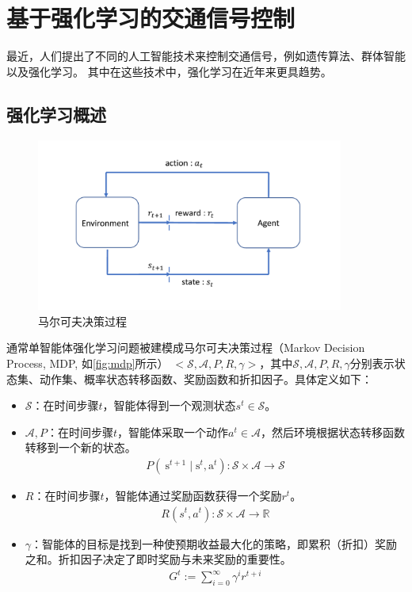 \section{基于强化学习的交通信号控制}
最近，人们提出了不同的人工智能技术来控制交通信号，例如遗传算法、群体智能以及强化学习。 其中在这些技术中，强化学习在近年来更具趋势。
\subsection{强化学习概述}
\begin{figure}[htb]
    \includegraphics[width=0.9\textwidth]{fig/rl.pdf}
    \caption{马尔可夫决策过程}
    \label{fig:mdp}
\end{figure}
通常单智能体强化学习问题被建模成马尔可夫决策过程（Markov Decision Process, MDP, 如\autoref{fig:mdp}所示） $<\mathcal{S}, \mathcal{A}, P, R, \gamma>$，其中$\mathcal{S}, \mathcal{A}, P, R, \gamma$分别表示状态集、动作集、概率状态转移函数、奖励函数和折扣因子。具体定义如下：
\begin{itemize}
    \item $\mathcal{S}$：在时间步骤$t$，智能体得到一个观测状态$s^t \in \mathcal{S}$。
    \item $\mathcal{A}, P$：在时间步骤$t$，智能体采取一个动作$a^t \in \mathcal{A}$，然后环境根据状态转移函数转移到一个新的状态。
    \begin{align}
        P\left(\mathrm{~s}^{t+1} \mid \mathrm{s}^{t}, \mathrm{a}^{t}\right): \mathcal{S} \times \mathcal{A} \rightarrow \mathcal{S}
    \end{align}
    \item $R$：在时间步骤$t$，智能体通过奖励函数获得一个奖励$r^t$。
    \begin{align}
        R\left(s^{t}, a^{t}\right): \mathcal{S} \times \mathcal{A} \rightarrow \mathbb{R}
    \end{align}
    \item $\gamma$：智能体的目标是找到一种使预期收益最大化的策略，即累积（折扣）奖励之和。折扣因子决定了即时奖励与未来奖励的重要性。
    \begin{align}
        G^{t}:=\sum_{i=0}^{\infty} \gamma^{i} r^{t+i}
    \end{align}
  \end{itemize}
